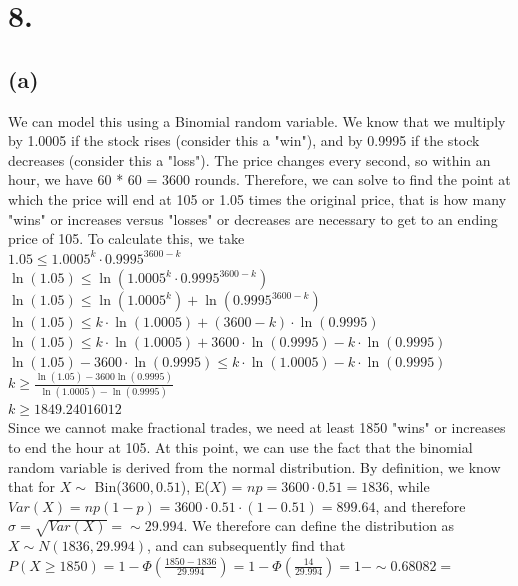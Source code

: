 \documentclass{article}
\begin{document}
\section*{8.}
{\Large 

\subsection*{(a)}
We can model this using a Binomial random variable. We know that we multiply by 1.0005 if the stock rises (consider this a "win"), and by 0.9995 if the stock decreases (consider this a "loss"). The price changes every second, so within an hour, we have 60 * 60 = 3600 rounds. Therefore, we can solve to find the point at which the price will end at 105 or 1.05 times the original price, that is how many "wins" or increases versus "losses" or decreases are necessary to get to an ending price of 105. To calculate this, we take \\ 
$1.05 \leq 1.0005^{k} \cdot 0.9995^{3600 - k}$ \\ 
$\ln(1.05) \leq \ln(1.0005^{k} \cdot 0.9995^{3600 - k})$ \\ 
$\ln(1.05) \leq \ln(1.0005^{k}) + \ln(0.9995^{3600 - k})$ \\ 
$\ln(1.05) \leq k \cdot \ln(1.0005) + (3600 - k) \cdot \ln(0.9995)$ \\ 
$\ln(1.05) \leq k \cdot \ln(1.0005) + 3600 \cdot \ln(0.9995) - k \cdot \ln(0.9995)$ \\ 
$\ln(1.05) - 3600 \cdot \ln(0.9995) \leq k \cdot \ln(1.0005) - k \cdot \ln(0.9995)$ \\ 
$k \geq \frac{\ln(1.05) - 3600\ln(0.9995)}{\ln(1.0005) - \ln(0.9995)}$ \\
$k \geq 1849.24016012$ \\ 
Since we cannot make fractional trades, we need at least 1850 "wins" or increases to end the hour at 105. At this point, we can use the fact that the binomial random variable is derived from the normal distribution. By definition, we know that for $X \sim $ Bin($3600, 0.51$), E($X$) = $np = 3600 \cdot 0.51 = 1836$, while $Var(X) = np(1 - p) = 3600 \cdot 0.51 \cdot (1 - 0.51) = 899.64$, and therefore $\sigma = \sqrt{Var(X)} = \sim 29.994$. We therefore can define the distribution as $X \sim N(1836, 29.994)$, and can subsequently find that $P(X \geq 1850) = 1 - \Phi(\frac{1850 - 1836}{29.994}) = 1 - \Phi(\frac{14}{29.994}) = 1 - \sim 0.68082 = $ 

}
\end{document}
